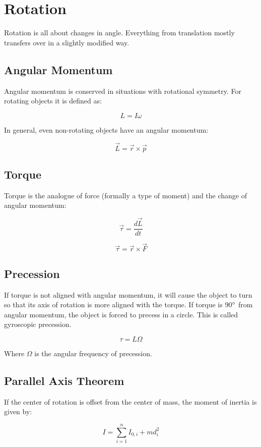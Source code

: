 \documentclass{article}
\begin{document}
\section{Rotation}

Rotation is all about changes in angle. Everything from translation mostly transfers over in a slightly modified way. 

\subsection{Angular Momentum}

Angular momentum is conserved in situations with rotational symmetry. For rotating objects it is defined as:

$$L=I\omega$$

In general, even non-rotating objects have an angular momentum:

$$\vec{L}=\vec{r}\times \vec{p}$$

\subsection{Torque}

Torque is the analogue of force (formally a type of moment) and the change of angular momentum:

$$\vec{\tau}=\frac{d\vec{L}}{dt}$$

$$\vec{\tau}=\vec{r}\times\vec{F}$$

\subsection{Precession}

If torque is not aligned with angular momentum, it will cause the object to turn so that its axis of rotation is more aligned with the torque. If torque is 90$\degree$ from angular momentum, the object is forced to precess in a circle. This is called gyroscopic precession.

$$\tau=L\Omega$$

Where $\Omega$ is the angular frequency of precession.

\subsection{Parallel Axis Theorem}

If the center of rotation is offset from the center of mass, the moment of inertia is given by:

$$I=\sum\limits_{i=1}^{n} I_{0,i} + md_{i}^2$$
\end{document}
